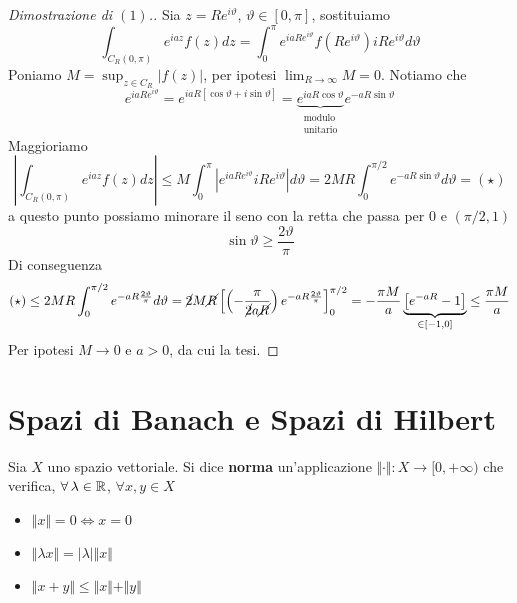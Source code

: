 \begin{proof}[Dimostrazione di $(1)$.]

Sia $z = Re^{i\vartheta}$, $\vartheta \in [0, \pi]$, sostituiamo
\begin{equation*}
\int_{C_{R} (0, \pi)} e^{iaz} f(z)dz = \int^{\pi}_{0} e^{iaRe^{i\vartheta}} f\left(Re^{i\vartheta}\right) iRe^{i\vartheta} d\vartheta
\end{equation*}
Poniamo $M = \sup_{z\in C_{R}}| f(z)| $, per ipotesi $\lim_{R\rightarrow \infty} M = 0$. Notiamo che
\begin{equation*}
e^{iaRe^{i\vartheta}} = e^{iaR[\cos \vartheta + i\sin \vartheta]} = \underbrace{e^{iaR\cos \vartheta}}_{\substack{\text{modulo}\\\text{unitario}}} e^{- aR\sin \vartheta}
\end{equation*}
Maggioriamo
\begin{equation*}
\left| \int_{C_{R} (0, \pi)} e^{iaz} f(z)dz\right| \leq M\int^{\pi}_{0}\left| e^{iaRe^{i\vartheta}} iRe^{i\vartheta}\right| d\vartheta = 2MR\int^{\pi /2}_{0} e^{- aR\sin \vartheta} d\vartheta = (\star)
\end{equation*}
a questo punto possiamo minorare il seno con la retta che passa per $0$ e $(\pi /2, 1)$
\begin{equation*}
\sin \vartheta \geq \frac{2\vartheta}{\pi}
\end{equation*}
Di conseguenza
\begin{equation*}
(\star) \leq 2MR\int^{\pi /2}_{0} e^{- aR\frac{2\vartheta}{\pi}} d\vartheta = \cancel{2} M\cancel{R}\left[\left(- \frac{\pi}{\cancel{2} a\cancel{R}}\right) e^{- aR\frac{2\vartheta}{\pi}}\right]^{\pi /2}_{0} = - \frac{\pi M}{a}\underbrace{\left[e^{- aR} - 1\right]}_{\in [ - 1, 0]} \leq \frac{\pi M}{a}
\end{equation*}
Per ipotesi $M\rightarrow 0$ e $a > 0$, da cui la tesi.
\end{proof}

\chapter{Spazi di Banach e Spazi di Hilbert}

\begin{defn}
[Norma]
Sia $X$ uno spazio vettoriale. Si dice \textbf{norma} un'applicazione $ \Vert \cdot \Vert : X\rightarrow [0, + \infty)$ che verifica, $\forall \lambda \in \RR$, $\forall x, y\in X$
\begin{itemize}
\item $ \Vert x \Vert = 0\iff x = 0$
\item $ \Vert \lambda x \Vert = | \lambda | \Vert x \Vert $
\item $ \Vert x + y \Vert \leq \Vert x \Vert + \Vert y \Vert $
\end{itemize}
\end{defn}

